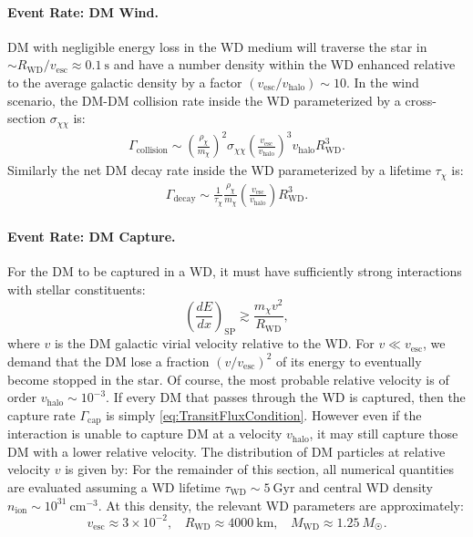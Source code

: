 \documentclass[preprintnumbers,amsmath,amssymb,prd,superscriptaddress]{revtex4}
\newcommand{\cm}{\text{cm}}
\def\r{\right)}
\def\l{\left(}
\begin{document}
\paragraph{Event Rate: DM Wind.}
DM with negligible energy loss in the WD medium will traverse the star in $\sim R_\text{WD}/v_\text{esc} \approx 0.1 ~\text{s}$ and have a number density within the WD enhanced relative to the average galactic density by a factor $(v_\text{esc}/v_\text{halo}) \sim 10$.
In the wind scenario, the DM-DM collision rate inside the WD parameterized by a cross-section $\sigma_{\chi \chi}$ is:
\begin{align}
  \Gamma_\text{collision}
  \sim \l \frac{\rho_\chi}{m_\chi} \r^2 \sigma_{\chi \chi} \l \frac{v_\text{esc}}{v_\text{halo}}\r^3 v_\text{halo} R_\text{WD}^3.
  \label{eq:collisionDM}
\end{align}
Similarly the net DM decay rate inside the WD parameterized by a lifetime $\tau_\chi$ is:
\begin{align}
 \Gamma_\text{decay}
   \sim \frac{1}{\tau_\chi} \frac{\rho_{\chi}}{m_\chi} \l \frac{v_\text{esc}}{v_\text{halo}}\r R_\text{WD}^3.
  \label{eq:decayDM}
\end{align}

\paragraph{Event Rate: DM Capture.}
For the DM to be captured in a WD, it must have sufficiently strong interactions with stellar constituents:
\begin{equation}
\label{eq:capture}
\left( \frac{d E}{d x} \right)_\text{SP} \gtrsim \frac{m_\chi v^2}{R_\text{WD}},
\end{equation}
where $v$ is the DM galactic virial velocity relative to the WD.  
For $v \ll v_\text{esc}$, we demand that the DM lose a fraction $(v/v_\text{esc})^2$ of its energy to eventually become stopped in the star. 
Of course, the most probable relative velocity is of order $v_\text{halo} \sim 10^{-3}$.
If every DM that passes through the WD is captured, then the capture rate $\Gamma_\text{cap}$ is simply \eqref{eq:TransitFluxCondition}. 
However even if the interaction is unable to capture DM at a velocity $v_\text{halo}$, it may still capture those DM with a lower relative velocity. 
The distribution of DM particles at relative velocity $v$ is given by:
For the remainder of this section, all numerical quantities are evaluated assuming a WD lifetime $\tau_\text{WD} \sim 5 ~\text{Gyr}$ and central WD density $n_\text{ion} \sim 10^{31} ~\cm^{-3}$. 
At this density, the relevant WD parameters are approximately: 
\begin{equation}
v_\text{esc} \approx 3 \times 10^{-2}, ~~~~ R_\text{WD} \approx 4000 ~\text{km}, ~~~~ M_\text{WD} \approx 1.25 ~M_{\astrosun}. 
\end{equation}
\end{document}

